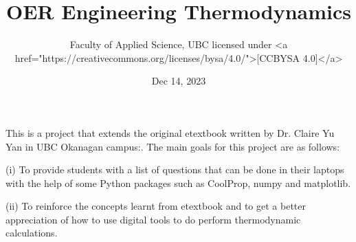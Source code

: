 \documentclass[letterpaper,10pt,english]{jupyterBook}
\title{OER Engineering Thermodynamics}
\date{Dec 14, 2023}
\author{Faculty of Applied Science, UBC licensed under <a href="https://creativecommons.org/licenses/by\sphinxhyphen{}sa/4.0/">{[}CC\sphinxhyphen{}BY\sphinxhyphen{}SA 4.0{]}</a>}
\begin{document}
\pagestyle{empty}
\sphinxmaketitle
\pagestyle{plain}
\sphinxtableofcontents
\pagestyle{normal}
\label{\detokenize{intro::doc}}


\sphinxAtStartPar
This is a project that extends the original e\sphinxhyphen{}textbook written by Dr. Claire Yu Yan in UBC Okanagan campus:. The main goals for this project are as follows:

\sphinxAtStartPar
(i) To provide students with a list of questions that can be done in their laptops with the help of some Python packages such as CoolProp, numpy and matplotlib.

\sphinxAtStartPar
(ii) To reinforce the concepts learnt from e\sphinxhyphen{}textbook and to get a better appreciation of how to use digital tools to do perform thermodynamic calculations.
\end{document}
